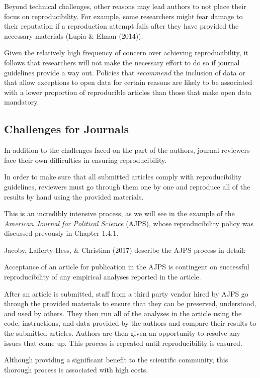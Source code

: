 \documentclass[12pt,twoside]{reedthesis}
\begin{document}
Beyond technical challenges, other reasons may lead authors to not place
their focus on reproducibility. For example, some researchers might fear
damage to their reputation if a reproduction attempt fails after they
have provided the necessary materials (Lupia \& Elman (2014)).

Given the relatively high frequency of concern over achieving
reproducibility, it follows that researchers will not make the necessary
effort to do so if journal guidelines provide a way out. Policies that
\emph{recommend} the inclusion of data or that allow exceptions to open
data for certain reasons are likely to be associated with a lower
proportion of reproducible articles than those that make open data
mandatory.

\subsection{Challenges for Journals}\label{challenges-for-journals}

In addition to the challenges faced on the part of the authors, journal
reviewers face their own difficulties in ensuring reproducibility.

In order to make sure that all submitted articles comply with
reproducibility guidelines, reviewers must go through them one by one
and reproduce all of the results by hand using the provided materials.

This is an incredibly intensive process, as we will see in the example
of the \emph{American Journal for Political Science} (AJPS), whose
reproducibility policy was discussed prevously in Chapter 1.4.1.

Jacoby, Lafferty-Hess, \& Christian (2017) describe the AJPS process in
detail:

Acceptance of an article for publication in the AJPS is contingent on
successful reproducibility of any empirical analyses reported in the
article.

After an article is submitted, staff from a third party vendor hired by
AJPS go through the provided materials to ensure that they can be
preserved, understood, and used by others. They then run all of the
analyses in the article using the code, instructions, and data provided
by the authors and compare their results to the submitted articles.
Authors are then given an opportunity to resolve any issues that come
up. This process is repeated until reproducibility is ensured.

Although providing a significant benefit to the scientific community,
this thorough process is associated with high costs.
\end{document}

